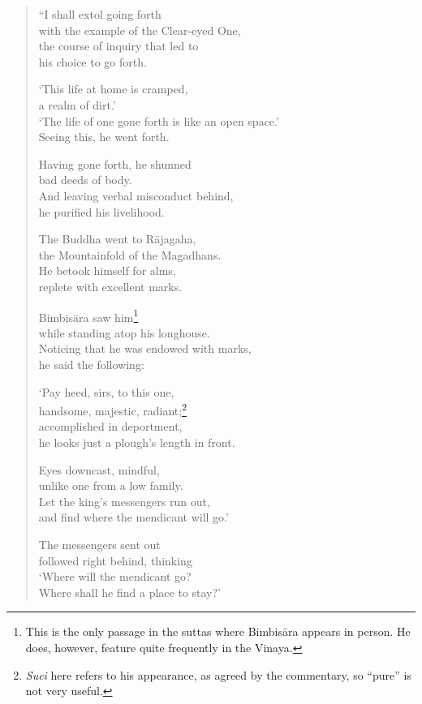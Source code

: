 \documentclass[12pt,openany]{book}%
\begin{document}
\begin{verse}%
“I shall extol going forth \\
with the example of the Clear-eyed One, \\
the course of inquiry that led to \\
his choice to go forth. 

‘This life at home is cramped, \\
a realm of dirt.’ \\
‘The life of one gone forth is like an open space.’ \\
Seeing this, he went forth. 

Having gone forth, he shunned \\
bad deeds of body. \\
And leaving verbal misconduct behind, \\
he purified his livelihood. 

The Buddha went to \textsanskrit{Rājagaha}, \\
the Mountainfold of the Magadhans. \\
He betook himself for alms, \\
replete with excellent marks. 

\textsanskrit{Bimbisāra} saw him\footnote{This is the only passage in the suttas where \textsanskrit{Bimbisāra} appears in person. He does, however, feature quite frequently in the Vinaya. } \\
while standing atop his longhouse. \\
Noticing that he was endowed with marks, \\
he said the following: 

‘Pay heed, sirs, to this one, \\
handsome, majestic, radiant;\footnote{\textit{Suci} here refers to his appearance, as agreed by the commentary, so “pure” is not very useful. } \\
accomplished in deportment, \\
he looks just a plough’s length in front. 

Eyes downcast, mindful, \\
unlike one from a low family. \\
Let the king’s messengers run out, \\
and find where the mendicant will go.’ 

The messengers sent out \\
followed right behind, thinking \\
‘Where will the mendicant go? \\
Where shall he find a place to stay?’ 


\end{verse}
\end{document}
